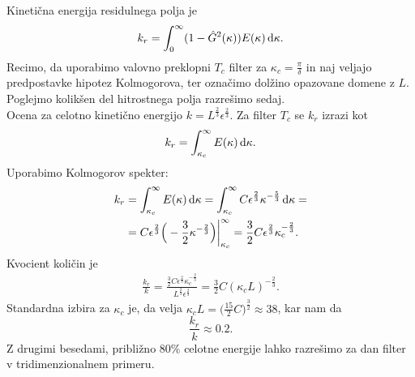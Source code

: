 \documentclass[mat2, tisk]{fmfdelo}
\begin{document}
\begin{primer}
Kinetična energija residulnega polja je 
$$
k_r = \int_{0}^{\infty} (1 - \hat{G}^2(\kappa)) E(\kappa) \dif \kappa.
$$
Recimo, da uporabimo valovno preklopni $T_c$ filter za $\kappa_c = \frac{\pi}{\delta}$ in naj veljajo
predpostavke hipotez Kolmogorova, ter označimo dolžino opazovane domene z $L$. 
Poglejmo kolikšen del hitrostnega polja razrešimo sedaj. \\

Ocena za celotno kinetično energijo $k = L^\frac{2}{3} \epsilon^\frac{2}{3}$. 
Za filter $T_c$ se $k_r$ izrazi kot 
$$
k_r = \int_{\kappa_c}^{\infty} E(\kappa) \dif \kappa. 
$$
Uporabimo Kolmogorov spekter: 
\begin{align*}
k_r &= \int_{\kappa_c}^{\infty} E(\kappa) \dif \kappa = \int_{\kappa_c}^{\infty} C \epsilon^{\frac{2}{3}} \kappa^{-\frac{5}{3}} \dif \kappa = \\
&= C \epsilon^{\frac{2}{3}} \Big(- \frac{3}{2} \kappa^{-\frac{2}{3}}\Big)\Big|_{\kappa_c}^\infty = \frac{3}{2} C \epsilon^{\frac{2}{3}}\kappa_c^{-\frac{2}{3}}.
\end{align*}
Kvocient količin je 
\begin{align*}
\frac{k_r}{k} = \frac{\frac{3}{2} C \epsilon^{\frac{2}{3}}\kappa_c^{-\frac{2}{3}}}{L^\frac{2}{3} \epsilon^\frac{2}{3}} = 
\frac{3}{2}C (\kappa_c L)^{-\frac{2}{3}}.
\end{align*}
Standardna izbira za $\kappa_c$ je, da velja $\kappa_c L = \Big(\frac{15}{2}C\Big)^\frac{3}{2} \approx 38$, 
kar nam da 
$$
\frac{k_r}{k} \approx 0.2.
$$
Z drugimi besedami, približno $80\%$ celotne energije lahko razrešimo 
za dan filter v tridimenzionalnem primeru.
\end{primer}
\end{document}
